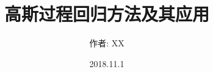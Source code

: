 \documentclass[a4paper,10.5pt,oweside]{article} %
\title{高斯过程回归方法及其应用}
\author{作者: XX}
\date{2018.11.1}%
\theoremstyle{definition}
\numberwithin{equation}{section} %
\begin{document}
    \thispagestyle{empty} %




    


    







    \titleformat{\section}{}{\thesection}{1em}{} %

    \nocite{herrmann2018object}
    \nocite{herrmann2018robust}
    \nocite{li_bundle_2018}
    \nocite{zhang_parallax-tolerant_2014}
    



    


    
\end{document}
